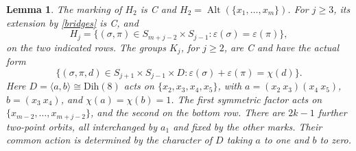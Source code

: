 \documentclass[11pt]{article}
\newcommand{\gen}[1]{\langle#1\rangle}
\newcommand{\Alt}{\operatorname{Alt}}
\newcommand{\eps}{\varepsilon}
\newtheorem{lemma}[theorem]{Lemma}
\begin{document}
\begin{lemma}\label{paths}
The marking of $H_2$ is C and $H_2=\Alt(\{x_1,\ldots,x_m\})$.
For $j\ge3$, its extension by \eqref{bridges} is C, and
\begin{equation}\label{P}
 H_j=\{(\sigma,\pi)\in S_{m+j-2}\times S_{j-1}:
                         \eps(\sigma)=\eps(\pi)\},
\end{equation}
on the two indicated rows. The groups $K_j$, for $j\ge2$, are
C and have the actual form
\begin{equation}\label{K}
 \{(\sigma,\pi,d)\in S_{j+1}\times S_{j-1}\times D:
              \eps(\sigma)+\eps(\pi)=\chi(d)\}.
\end{equation}
Here $D=\gen{a,b}\cong\mathrm{Dih}(8)$ acts on
$\{x_2,x_3,x_4,x_5\}$, with
$a=(x_2\ x_3)(x_4\ x_5)$, $b=(x_3\ x_4)$, and
$\chi(a)=\chi(b)=1$. The first symmetric factor acts on
$\{x_{m-2},\ldots,x_{m+j-2}\}$, and the second on the bottom
row. There are $2k-1$ further two-point orbits, all interchanged
by $a_1$ and fixed by the other marks. Their common action is
determined by the character of $D$ taking $a$ to one and $b$ to zero.
\end{lemma}
\end{document}
